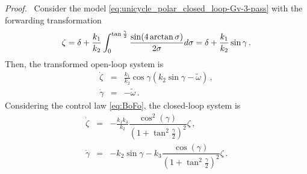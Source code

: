 \documentclass[10pt,a4paper]{amsart}
\renewenvironment{proof}[1][Proof]{\par\pushQED{\qed}\normalfont\textit{#1.}~}{\popQED\par}
\begin{document}
\begin{proof}
Consider the model \eqref{eq:unicycle_polar_closed_loop-Gv-3-pass}
with the forwarding transformation
\begin{equation}
\zeta = \delta + \frac{k_1}{k_2}\int_0^{\tan\frac{\gamma}{2}} \frac{\sin(4\arctan\sigma)}{2\sigma}{\rm d}\sigma = \delta + \dfrac{k_1}{k_2} \sin \gamma \,. \label{eq:forwarding_trans2}
\end{equation}
Then, the transformed open-loop system is
\begin{eqnarray}
\dot\zeta &=& \frac{k_1}{k_2}\cos\gamma\left(k_2\sin\gamma -%
\tilde\omega \right) \,,
\\
\dot\gamma &=& -  \tilde\omega\,.
\end{eqnarray}
Considering the control law \eqref{eq:BoFo}, 
the closed-loop system is
\begin{subequations}
    \label{eq:BoFo_temp}
\begin{eqnarray}
\dot\zeta &=& -\frac{k_1k_3}{k_2}\dfrac{\cos^2(\gamma)}{\left(1+\tan^2\frac{\gamma}{2}\right)^2} \zeta \,,
\\
\dot\gamma &=& - k_2\sin\gamma - k_3\dfrac{\cos(\gamma)}{\left(1+\tan^2\frac{\gamma}{2}\right)^2}\zeta\,.

\end{eqnarray}
\end{subequations}
\end{proof}
\end{document}
